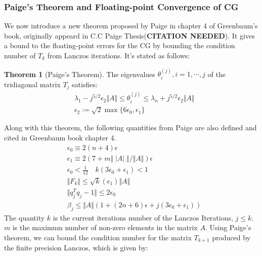 \documentclass[]{article}
\theoremstyle{definition}
\newtheorem{theorem}{Theorem}            %
\begin{document}
        \subsubsection{Paige's Theorem and Floating-point Convergence of CG}
            We now introduce a new theorem proposed by Paige in chapter 4 of Greenbaum's book\cite{book:greenbaum}, originally appeard in C.C Paige Thesis(\textbf{CITATION NEEDED}). It gives a bound to the floating-point errors for the CG by bounding the condition number of $T_k$ from Lanczos iterations. It's stated as follows: 
            \begin{theorem}[Paige's Theorem]\label{theorem:paige1}
                The eigenvalues $\theta_i^{(j)}, i = 1, \cdots, j$ of the tridiagonal matrix $T_j$ satisfies: 
                \begin{align}
                    & 
                    \lambda_1 - j^{5/2}\epsilon_2\Vert A\Vert 
                    \le \theta_i^{(j)}
                    \le 
                    \lambda_n + j^{5/2}\epsilon_2\Vert A\Vert
                    \\
                    &
                    \epsilon_2 := \sqrt{2}\max\{6\epsilon_0, \epsilon_1\}
                \end{align}
            \end{theorem}
            Along with this theorem, the following quantities from Paige are also defined and cited in Greenbaum book chapter 4. 
            \begin{align}
                & \epsilon_0 \equiv 2(n + 4)\epsilon
                \\
                & \epsilon_1 \equiv 2(7 + m \Vert  \;|A|\;\Vert/\Vert A\Vert)\epsilon
                \\
                & \epsilon_0 < \frac{1}{12} \quad k(3\epsilon_0 + \epsilon_1) < 1
                \\
                & \Vert F_k\Vert \le \sqrt{k}(\epsilon_1) \Vert A\Vert
                \\
                & \Vert q^T_jq_j -1\Vert \le 2\epsilon_0
                \\
                & \beta_j \le \Vert A\Vert(1 + (2n + 6)\epsilon + j(3\epsilon_0 + \epsilon_1))
            \end{align}
            The quantity $k$ is the current iterations number of the Lanczos Iterations, $j\le k$. $m$ is the maximum number of non-zero elements in the matrix $A$. 
            Using Paige's theorem, we can bound the condition number for the matrix $T_{k + 1}$ produced by the finite precision Lanczos, which is given by: 
\end{document}
